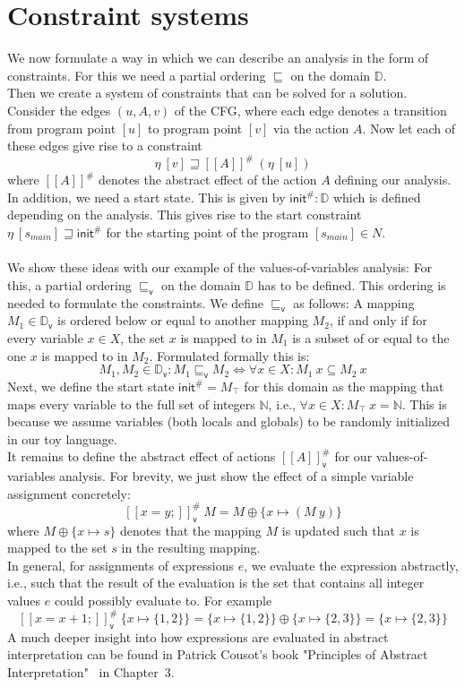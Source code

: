  \section{Constraint systems}
    We now formulate a way in which we can describe an analysis in the form of constraints. For this we need a partial ordering $\sqsubseteq$ on the domain $\mathbb{D}$.\\
    Then we create a system of constraints that can be solved for a solution. Consider the edges $(u, A, v)$ of the CFG, where each edge denotes a transition from program point $[u]$ to program point $[v]$ via the action $A$. Now let each of these edges give rise to a constraint
    \[\eta\ [v] \sqsupseteq [\![A]\!]^{\#}\ (\eta\ [u])\]
    where $[\![A]\!]^{\#}$ denotes the abstract effect of the action $A$ defining our analysis. In addition, we need a start state. This is given by $\textsf{init}^{\#}: \mathbb{D}$ which is defined depending on the analysis. This gives rise to the start constraint $\eta\ [s_{main}] \sqsupseteq \textsf{init}^{\#}$ for the starting point of the program $[s_{main}] \in N$.\\
    \\
    We show these ideas with our example of the values-of-variables analysis: For this, a partial ordering $\sqsubseteq_\textsf{v}$ on the domain $\mathbb{D}$ has to be defined. This ordering is needed to formulate the constraints. We define $\sqsubseteq_\textsf{v}$ as follows: A mapping $M_1 \in \mathbb{D}_\textsf{v}$ is ordered below or equal to another mapping $M_2$, if and only if for every variable $x \in X$, the set $x$ is mapped to in $M_1$ is a subset of or equal to the one $x$ is mapped to in $M_2$. Formulated formally this is:
    \[M_1, M_2 \in \mathbb{D}_\textsf{v}: M_1 \sqsubseteq_\textsf{v} M_2 \Longleftrightarrow \forall x \in X: M_1\ x \subseteq M_2\ x\]
    Next, we define the start state $\textsf{init}^{\#} = M_\top$ for this domain as the mapping that maps every variable to the full set of integers $\mathbb{N}$, i.e., $\forall x \in X: M_\top\ x = \mathbb{N}$. This is because we assume variables (both locals and globals) to be randomly initialized in our toy language.\\
    It remains to define the abstract effect of actions $[\![A]\!]^{\#}_\textsf{v}$ for our values-of-variables analysis. For brevity, we just show the effect of a simple variable assignment concretely:
    \[ [\![ x=y; ]\!]^{\#}_\textsf{v}\ M = M \oplus \{x \mapsto (M\ y) \} \]
    where $M \oplus \{x \mapsto s\}$ denotes that the mapping $M$ is updated such that $x$ is mapped to the set $s$ in the resulting mapping.\\
    In general, for assignments of expressions $e$, we evaluate the expression abstractly, i.e., such that the result of the evaluation is the set that contains all integer values $e$ could possibly evaluate to. For example 
    \[ [\![ x=x+1; ]\!]^{\#}_\textsf{v}\ \{x \mapsto \{1,2\}\} = \{x \mapsto \{1,2\}\} \oplus \{x \mapsto \{2,3\}\} = \{x \mapsto \{2,3\}\}\]
    A much deeper insight into how expressions are evaluated in abstract interpretation can be found in Patrick Cousot's book "Principles of Abstract Interpretation"~\parencite{cousot2021principles} in Chapter~3.


